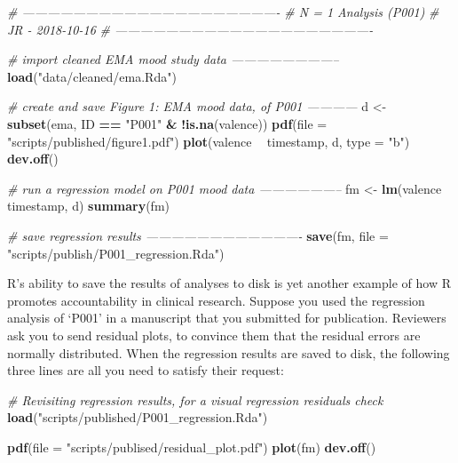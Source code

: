 \documentclass[]{book}
\newenvironment{Shaded}{\begin{snugshade}}{\end{snugshade}}
\newcommand{\KeywordTok}[1]{\textcolor[rgb]{0.13,0.29,0.53}{\textbf{#1}}}
\newcommand{\DataTypeTok}[1]{\textcolor[rgb]{0.13,0.29,0.53}{#1}}
\newcommand{\StringTok}[1]{\textcolor[rgb]{0.31,0.60,0.02}{#1}}
\newcommand{\CommentTok}[1]{\textcolor[rgb]{0.56,0.35,0.01}{\textit{#1}}}
\newcommand{\OperatorTok}[1]{\textcolor[rgb]{0.81,0.36,0.00}{\textbf{#1}}}
\newcommand{\NormalTok}[1]{#1}
\begin{document}
\begin{Shaded}
\begin{Highlighting}[]
\CommentTok{# -------------------------------------------------------------}
\CommentTok{# N = 1 Analysis (P001)}
\CommentTok{# JR - 2018-10-16}
\CommentTok{# -------------------------------------------------------------}

\CommentTok{# import cleaned EMA mood study data --------------------------}
\KeywordTok{load}\NormalTok{(}\StringTok{"data/cleaned/ema.Rda"}\NormalTok{)}

\CommentTok{# create and save Figure 1: EMA mood data, of P001 ------------ }
\NormalTok{d <-}\StringTok{ }\KeywordTok{subset}\NormalTok{(ema, ID }\OperatorTok{==}\StringTok{ "P001"} \OperatorTok{&}\StringTok{ }\OperatorTok{!}\KeywordTok{is.na}\NormalTok{(valence))}
\KeywordTok{pdf}\NormalTok{(}\DataTypeTok{file =} \StringTok{"scripts/published/figure1.pdf"}\NormalTok{)}
\KeywordTok{plot}\NormalTok{(valence }\OperatorTok{~}\StringTok{ }\NormalTok{timestamp, d, }\DataTypeTok{type =} \StringTok{"b"}\NormalTok{)}
\KeywordTok{dev.off}\NormalTok{()}

\CommentTok{# run a regression model on P001 mood data --------------------}
\NormalTok{fm <-}\StringTok{ }\KeywordTok{lm}\NormalTok{(valence }\OperatorTok{~}\StringTok{ }\NormalTok{timestamp, d)}
\KeywordTok{summary}\NormalTok{(fm)}

\CommentTok{# save regression results -------------------------------------}
\KeywordTok{save}\NormalTok{(fm, }\DataTypeTok{file =} \StringTok{"scripts/publish/P001_regression.Rda"}\NormalTok{)}
\end{Highlighting}
\end{Shaded}

R's ability to save the results of analyses to disk is yet another
example of how R promotes accountability in clinical research. Suppose
you used the regression analysis of `P001' in a manuscript that you
submitted for publication. Reviewers ask you to send residual plots, to
convince them that the residual errors are normally distributed. When
the regression results are saved to disk, the following three lines are
all you need to satisfy their request:

\begin{Shaded}
\begin{Highlighting}[]
\CommentTok{# Revisiting regression results, for a visual regression residuals check  }
\KeywordTok{load}\NormalTok{(}\StringTok{"scripts/published/P001_regression.Rda"}\NormalTok{)}

\KeywordTok{pdf}\NormalTok{(}\DataTypeTok{file =} \StringTok{"scripts/publised/residual_plot.pdf"}\NormalTok{)}
\KeywordTok{plot}\NormalTok{(fm)}
\KeywordTok{dev.off}\NormalTok{()}
\end{Highlighting}
\end{Shaded}
\end{document}
